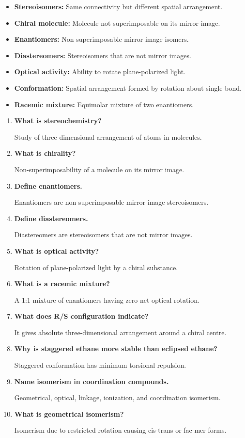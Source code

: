 \documentclass[12pt,a4paper]{article}
\newcommand{\Q}[1]{\textbf{#1}\par\noindent\ignorespaces}
\begin{document}
\begin{tcolorbox}[defbox, title={One-Line Definitions}]
\begin{itemize}[leftmargin=*, itemsep=2pt, topsep=2pt]
  \item \textbf{Stereoisomers:} Same connectivity but different spatial arrangement.
  \item \textbf{Chiral molecule:} Molecule not superimposable on its mirror image.
  \item \textbf{Enantiomers:} Non-superimposable mirror-image isomers.
  \item \textbf{Diastereomers:} Stereoisomers that are not mirror images.
  \item \textbf{Optical activity:} Ability to rotate plane-polarized light.
  \item \textbf{Conformation:} Spatial arrangement formed by rotation about single bond.
  \item \textbf{Racemic mixture:} Equimolar mixture of two enantiomers.
\end{itemize}
\end{tcolorbox}

\begin{tcolorbox}[exambox, title={Frequently Asked / Viva Questions}]
\begin{enumerate}[topsep=0pt, label=\textbf{Q\arabic*.}, itemsep=5pt]
  \item \Q{What is stereochemistry?}
    Study of three-dimensional arrangement of atoms in molecules.
  \item \Q{What is chirality?}
    Non-superimposability of a molecule on its mirror image.
  \item \Q{Define enantiomers.}
    Enantiomers are non-superimposable mirror-image stereoisomers.
  \item \Q{Define diastereomers.}
    Diastereomers are stereoisomers that are not mirror images.
  \item \Q{What is optical activity?}
    Rotation of plane-polarized light by a chiral substance.
  \item \Q{What is a racemic mixture?}
    A 1:1 mixture of enantiomers having zero net optical rotation.
  \item \Q{What does R/S configuration indicate?}
    It gives absolute three-dimensional arrangement around a chiral centre.
  \item \Q{Why is staggered ethane more stable than eclipsed ethane?}
    Staggered conformation has minimum torsional repulsion.
  \item \Q{Name isomerism in coordination compounds.}
    Geometrical, optical, linkage, ionization, and coordination isomerism.
  \item \Q{What is geometrical isomerism?}
    Isomerism due to restricted rotation causing cis-trans or fac-mer forms.
\end{enumerate}
\end{tcolorbox}
\end{document}
